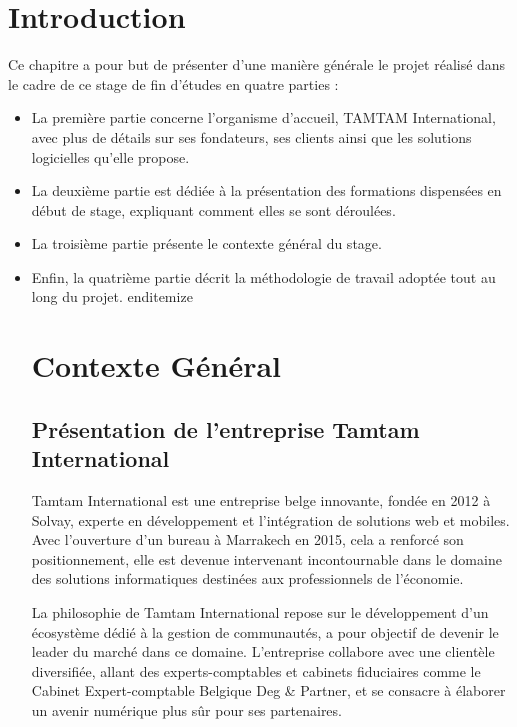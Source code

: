 \section{Introduction}

Ce chapitre a pour but de présenter d'une manière générale le projet réalisé dans le cadre de ce stage de fin d'études en quatre parties :

\begin{itemize}
    \item La première partie concerne l'organisme d'accueil, TAMTAM International, avec plus de détails sur ses fondateurs, ses clients ainsi que les solutions logicielles qu'elle propose.
    
    \item La deuxième partie est dédiée à la présentation des formations dispensées en début de stage, expliquant comment elles se sont déroulées.
    
    \item La troisième partie présente le contexte général du stage.
    
    \item Enfin, la quatrième partie décrit la méthodologie de travail adoptée tout au long du projet.
end{itemize}

\section{Contexte Général}

\subsection{Présentation de l'entreprise Tamtam International}

Tamtam International est une entreprise belge innovante, fondée en 2012 à Solvay, experte en développement et l'intégration de solutions web et mobiles. Avec l'ouverture d'un bureau à Marrakech en 2015, cela a renforcé son positionnement, elle est devenue intervenant incontournable dans le domaine des solutions informatiques destinées aux professionnels de l'économie.

La philosophie de Tamtam International repose sur le développement d'un écosystème dédié à la gestion de communautés, a pour objectif de devenir le leader du marché dans ce domaine. L'entreprise collabore avec une clientèle diversifiée, allant des experts-comptables et cabinets fiduciaires comme le Cabinet Expert-comptable Belgique Deg \& Partner, et se consacre à élaborer un avenir numérique plus sûr pour ses partenaires.


\end{itemize}
